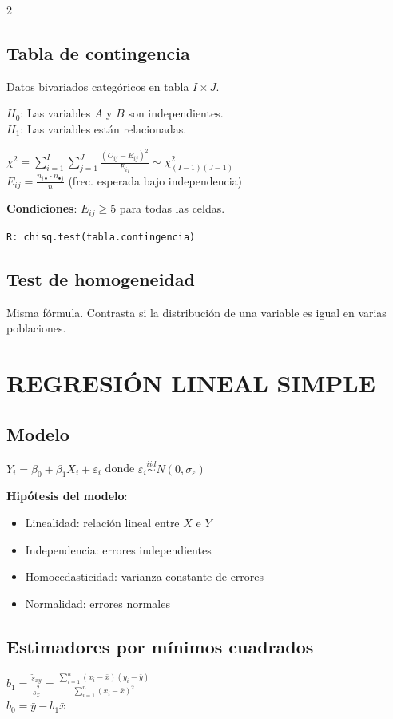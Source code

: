 \documentclass[9pt,a4paper]{article}
\newcommand{\R}{\texttt{R: }}
\begin{document}
\begin{multicols}{2}
\subsection{Tabla de contingencia}
Datos bivariados categóricos en tabla $I\times J$.

$H_0$: Las variables $A$ y $B$ son independientes.\\
$H_1$: Las variables están relacionadas.

\begin{formulabox}
$\chi^2=\sum_{i=1}^{I}\sum_{j=1}^{J}\frac{(O_{ij}-E_{ij})^2}{E_{ij}}\sim\chi^2_{(I-1)(J-1)}$\\[5pt]
$E_{ij}=\frac{n_{i\bullet}\cdot n_{\bullet j}}{n}$ (frec. esperada bajo independencia)
\end{formulabox}

\textbf{Condiciones}: $E_{ij}\geq 5$ para todas las celdas.

\R\texttt{chisq.test(tabla.contingencia)}

\subsection{Test de homogeneidad}
Misma fórmula. Contrasta si la distribución de una variable es igual en varias poblaciones.

\section{REGRESIÓN LINEAL SIMPLE}

\subsection{Modelo}
$Y_i=\beta_0+\beta_1 X_i+\varepsilon_i$ donde $\varepsilon_i\stackrel{iid}{\sim}N(0,\sigma_\varepsilon)$

\textbf{Hipótesis del modelo}:
\begin{itemize}[leftmargin=*]
\item Linealidad: relación lineal entre $X$ e $Y$
\item Independencia: errores independientes
\item Homocedasticidad: varianza constante de errores
\item Normalidad: errores normales
\end{itemize}

\subsection{Estimadores por mínimos cuadrados}
\begin{formulabox}
$b_1=\frac{\tilde{s}_{xy}}{\tilde{s}_x^2}=\frac{\sum_{i=1}^n(x_i-\bar{x})(y_i-\bar{y})}{\sum_{i=1}^n(x_i-\bar{x})^2}$\\[5pt]
$b_0=\bar{y}-b_1\bar{x}$
\end{formulabox}


\end{multicols}
\end{document}

